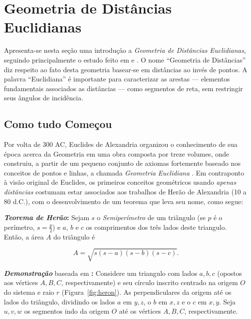 \section{Geometria de Distâncias Euclidianas\label{sec:GD}}
Apresenta-se nesta seção uma introdução a \textit{Geometria de Distâncias Euclidianas}, seguindo principalmente o estudo feito em \cite{libertiEDG} e \cite{carlileGDandAplications}. O nome ``Geometria de Distâncias'' diz respeito ao fato desta geometria basear-se em distâncias ao invés de pontos. A palavra ``Euclidiana'' é importante para caracterizar as arestas --- elementos fundamentais associados as distâncias --- como segmentos de reta, sem restringir seus ângulos de incidência.

\subsection{Como tudo Começou}

Por volta de 300 AC, Euclides de Alexandria organizou o conhecimento de sua época acerca da Geometria em uma obra composta por treze volumes, onde construiu, a partir de um pequeno conjunto de axiomas fortemente baseado nos conceitos de pontos e linhas, a chamada \textit{Geometria Euclidiana} \cite{elementosEuclides}. Em contraponto à visão original de Euclides, os primeiros conceitos geométricos usando \textit{apenas distâncias} costumam estar associados aos trabalhos de Herão de Alexandria (10 a 80 d.C.), com o desenvolvimento de um teorema que leva seu nome, como segue: 
\begin{center}
	\begin{minipage}{0.9 \linewidth}
		\textbf{\textit{Teorema de Herão}:} Sejam $s$ o \textit{Semiperímetro} de um triângulo (se $p$ é o perímetro, $s = \frac{p}{2}$) e $a$, $b$ e $c$ os comprimentos dos três lados deste triangulo. Então, a área $A$ do triângulo é
		
		\begin{equation}\tag{Fórmula de Herão}
		A = \sqrt{s(s-a)(s-b)(s-c)}.
		\label{eq:Herão}
		\end{equation}
	\end{minipage}
\end{center} 

\textbf{\textit{Demonstração}} baseada em \cite{libertiSixGemsDGHistory}\textbf{:} Considere um triangulo com lados $a,b,c$ (opostos aos vértices $A,B,C$, respectivamente) e seu círculo inscrito centrado na origem $O$ do sistema e raio $r$ (Figura~\ref{fig:heron}). As perpendiculares da origem até os lados do triângulo, dividindo os lados $a$ em $y,z$, o $b$ em $x,z$ e o $c$ em $x,y$. Seja $u,v,w$ os segmentos indo da origem $O$ até os vértices $A,B,C$, respectivamente.

